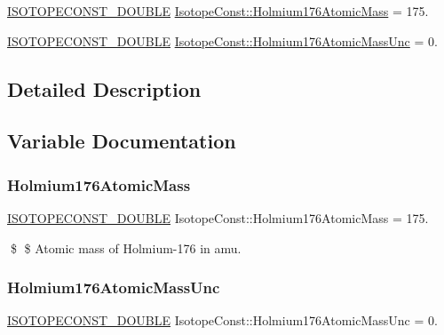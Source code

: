 \begin{DoxyCompactItemize}
\item 
\mbox{\hyperlink{group___isotope_const-_macros_ga8f45a7272ce02c0b4c65c44636ed719a}{I\+S\+O\+T\+O\+P\+E\+C\+O\+N\+S\+T\+\_\+\+D\+O\+U\+B\+LE}} \mbox{\hyperlink{group___isotope_const-_holmium-_ho176_ga75b060bd100e5cb8d1029fa336c360f1}{Isotope\+Const\+::\+Holmium176\+Atomic\+Mass}} = 175.
\item 
\mbox{\hyperlink{group___isotope_const-_macros_ga8f45a7272ce02c0b4c65c44636ed719a}{I\+S\+O\+T\+O\+P\+E\+C\+O\+N\+S\+T\+\_\+\+D\+O\+U\+B\+LE}} \mbox{\hyperlink{group___isotope_const-_holmium-_ho176_ga3b92781a80b8490d1fac94226742cb32}{Isotope\+Const\+::\+Holmium176\+Atomic\+Mass\+Unc}} = 0.
\end{DoxyCompactItemize}


\subsection{Detailed Description}


\subsection{Variable Documentation}
\mbox{\label{group___isotope_const-_holmium-_ho176_ga75b060bd100e5cb8d1029fa336c360f1}} 
\subsubsection{\texorpdfstring{Holmium176\+Atomic\+Mass}{Holmium176AtomicMass}}
{\footnotesize\ttfamily \mbox{\hyperlink{group___isotope_const-_macros_ga8f45a7272ce02c0b4c65c44636ed719a}{I\+S\+O\+T\+O\+P\+E\+C\+O\+N\+S\+T\+\_\+\+D\+O\+U\+B\+LE}} Isotope\+Const\+::\+Holmium176\+Atomic\+Mass = 175.}

\$ \$ Atomic mass of Holmium-\/176 in amu. \mbox{\label{group___isotope_const-_holmium-_ho176_ga3b92781a80b8490d1fac94226742cb32}} 
\subsubsection{\texorpdfstring{Holmium176\+Atomic\+Mass\+Unc}{Holmium176AtomicMassUnc}}
{\footnotesize\ttfamily \mbox{\hyperlink{group___isotope_const-_macros_ga8f45a7272ce02c0b4c65c44636ed719a}{I\+S\+O\+T\+O\+P\+E\+C\+O\+N\+S\+T\+\_\+\+D\+O\+U\+B\+LE}} Isotope\+Const\+::\+Holmium176\+Atomic\+Mass\+Unc = 0.}

